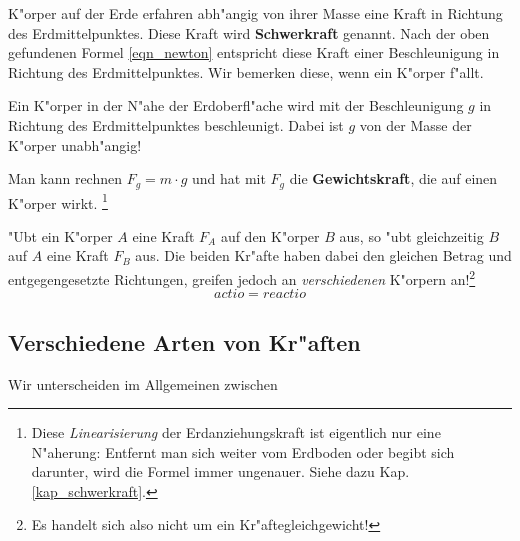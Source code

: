 K"orper auf der Erde erfahren abh"angig von ihrer Masse eine Kraft in
Richtung des Erdmittelpunktes. Diese Kraft wird \textbf{Schwerkraft}
genannt. Nach der oben gefundenen Formel \ref{eqn_newton} entspricht
diese Kraft einer Beschleunigung in Richtung des Erdmittelpunktes. Wir
bemerken diese, wenn ein K"orper f"allt.
\begin{Def}
   Ein K"orper in der N"ahe der Erdoberfl"ache wird mit der
   Beschleunigung $g$ in Richtung des Erdmittelpunktes
   beschleunigt. Dabei ist $g$ von der Masse der K"orper unabh"angig!
     
   Man kann rechnen $F_g = m \cdot g$ und hat mit $F_g$ die
   \textbf{Gewichtskraft}, die auf einen K"orper wirkt. \footnote{Diese
     \emph{Linearisierung} der Erdanziehungskraft ist eigentlich nur
     eine N"aherung: Entfernt man sich weiter vom Erdboden oder begibt
     sich darunter, wird die Formel immer ungenauer. Siehe dazu
     Kap. \ref{kap_schwerkraft}.}
\end{Def}



\begin{Wichtig}[actio = reactio (III. \textsc{Newton}'sches
   Axiom)]
   "Ubt ein K"orper $A$ eine Kraft $F_A$ auf den K"orper $B$ aus, so "ubt
   gleichzeitig $B$ auf $A$ eine Kraft $F_B$ aus. Die beiden Kr"afte
   haben dabei den gleichen Betrag und entgegengesetzte Richtungen,
   greifen jedoch an \emph{verschiedenen} K"orpern an!\footnote{Es
     handelt sich also nicht um ein Kr"aftegleichgewicht!}
     \begin{equation}
          \boxed{actio = reactio}
         \label{eqn_actio-reactio}
     \end{equation}
\end{Wichtig}






\subsection{Verschiedene Arten von Kr"aften}
\label{kap_arten_von_kraeften}

Wir unterscheiden im Allgemeinen zwischen

